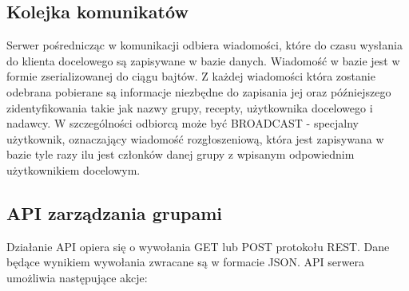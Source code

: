 \documentclass[11pt,a4paper,polish,thesis]{dcsbook}
\begin{document}
\subsection{Kolejka komunikatów}
Serwer pośrednicząc w komunikacji odbiera wiadomości, które do czasu wysłania do klienta docelowego są zapisywane w bazie danych.
Wiadomość w bazie jest w formie zserializowanej do ciągu bajtów.
Z każdej wiadomości która zostanie odebrana pobierane są informacje niezbędne do zapisania jej oraz późniejszego zidentyfikowania takie jak nazwy grupy, recepty, użytkownika docelowego i nadawcy. W szczególności odbiorcą może być BROADCAST - specjalny użytkownik, oznaczający wiadomość rozgłoszeniową, która jest zapisywana w bazie tyle razy ilu jest członków danej grupy z wpisanym odpowiednim użytkownikiem docelowym. 

\subsection{API zarządzania grupami}
Działanie API opiera się o wywołania GET lub POST protokołu REST. Dane będące wynikiem wywołania zwracane są w formacie JSON.
API serwera umożliwia następujące akcje:
\end{document}
